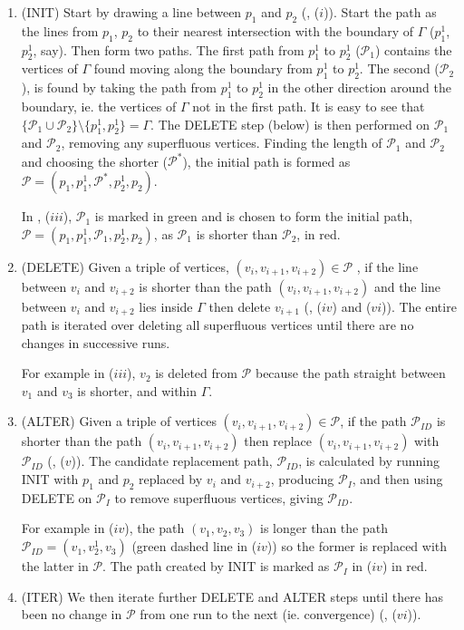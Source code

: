 \begin{enumerate}
\item (INIT) Start by drawing a line between $p_1$ and $p_2$ (, ($i$)). Start the path as the lines from $p_1$, $p_2$ to their nearest intersection with the boundary of $\Gamma$ ($p_1^1$, $p_2^1$, say). Then form two paths. The first path from $p_1^1$ to $p_2^1$ ($\mathcal{P}_1$) contains the vertices of $\Gamma$ found moving along the boundary from $p_1^1$ to $p_2^1$. The second ($\mathcal{P}_2$), is found by taking the path from $p_1^1$ to $p_2^1$ in the other direction around the boundary, ie. the vertices of $\Gamma$ not in the first path. It is easy to see that $\{\mathcal{P}_1 \cup \mathcal{P}_2\} \setminus \{p_1^1, p_2^1\} = \Gamma$. The DELETE step (below) is then performed on $\mathcal{P}_1$ and $\mathcal{P}_2$, removing any superfluous vertices. Finding the length of $\mathcal{P}_1$ and $\mathcal{P}_2$ and choosing the shorter ($\mathcal{P^*}$), the initial path is formed as $\mathcal{P}=(p_1,p_1^1,\mathcal{P}^*,p_2^1,p_2)$. 

In , ($iii$), $\mathcal{P}_1$ is marked in green and is chosen to form the initial path, $\mathcal{P}=(p_1,p_1^1,\mathcal{P}_1,p_2^1,p_2)$, as $\mathcal{P}_1$ is shorter than $\mathcal{P}_2$, in red.

\item (DELETE) Given a triple of vertices, $(v_i, v_{i+1}, v_{i+2}) \in \mathcal{P}$ , if the line between $v_i$ and $v_{i+2}$ is shorter than the path $(v_i, v_{i+1}, v_{i+2})$ and the line between $v_i$ and $v_{i+2}$ lies inside $\Gamma$ then delete $v_{i+1}$ (, ($iv$) and ($vi$)). The entire path is iterated over deleting all superfluous vertices until there are no changes in successive runs. 

For example in  ($iii$), $v_2$ is deleted from $\mathcal{P}$ because the path straight between $v_1$ and $v_3$ is shorter, and within $\Gamma$.

\item (ALTER) Given a triple of vertices $(v_i, v_{i+1}, v_{i+2}) \in \mathcal{P}$, if the path $\mathcal{P}_{ID}$ is shorter than the path $(v_i, v_{i+1}, v_{i+2})$ then replace $(v_i, v_{i+1}, v_{i+2})$ with $\mathcal{P}_{ID}$ (, ($v$)). The candidate replacement path, $\mathcal{P}_{ID}$, is calculated by running INIT with $p_1$ and $p_2$ replaced by $v_i$ and $v_{i+2}$, producing $\mathcal{P}_I$, and then using DELETE on $\mathcal{P}_I$ to remove superfluous vertices, giving $\mathcal{P}_{ID}$.

For example in  ($iv$), the path $(v_1, v_2, v_3)$ is longer than the path $\mathcal{P}_{ID}=(v_1, v^1_2, v_3)$ (green dashed line in ($iv$)) so the former is replaced with the latter in $\mathcal{P}$. The path created by INIT is marked as $\mathcal{P}_{I}$ in  ($iv$) in red.

\item (ITER) We then iterate further DELETE and ALTER steps until there has been no change in $\mathcal{P}$ from one run to the next (ie. convergence) (, ($vi$)).
\end{enumerate}

